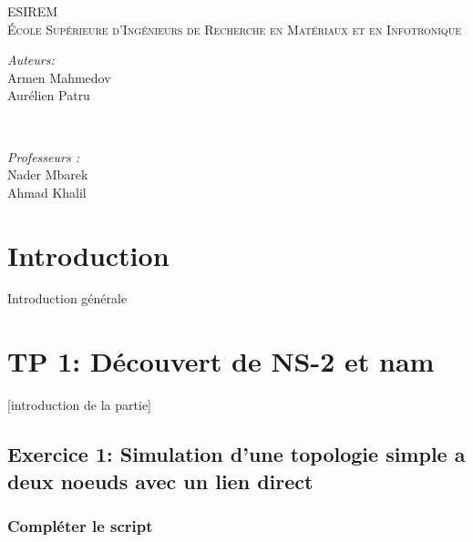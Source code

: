 \documentclass[11pt]{article}
\begin{document}
\begin{titlepage}
	\vfill 
	\begin{center}
        \textsc{\large
        	ESIREM \\
			École Supérieure d'Ingénieurs de Recherche en Matériaux et en Infotronique\\       	
			[2cm]
		}
	\end{center}

	\begin{minipage}{0.5\textwidth}
		\begin{flushleft} \large
			\emph{Auteurs:}\\
			Armen Mahmedov \\
			Aurélien Patru
		\end{flushleft}
	\end{minipage}
	~
	\begin{minipage}{0.5\textwidth}
		\begin{flushright}\large
			\emph{Professeurs :} \\
			Nader Mbarek \\
			Ahmad Khalil
		\end{flushright}
	\end{minipage}
        
\end{titlepage}
  
\newpage
\strut
\newpage


\tableofcontents


\pagebreak


\section*{Introduction}
Introduction générale 

\pagebreak


\section{TP 1: Découvert de NS-2 et nam}
[introduction de la partie]

\subsection{Exercice 1: Simulation d'une topologie simple a deux noeuds avec un lien direct}

\subsubsection{Compléter le script}
\end{document}
